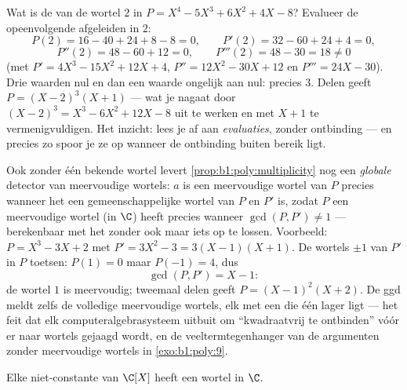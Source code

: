 \begin{example}\label{ex:b1:poly:multexample}
Wat is de  van de wortel $2$ in $P = X^4 - 5X^3 + 6X^2 + 4X
- 8$? Evalueer de opeenvolgende afgeleiden in $2$:
\[
P(2) = 16 - 40 + 24 + 8 - 8 = 0, \qquad
P'(2) = 32 - 60 + 24 + 4 = 0,
\]
\[
P''(2) = 48 - 60 + 12 = 0, \qquad
P'''(2) = 48 - 30 = 18 \neq 0
\]
(met $P' = 4X^3 - 15X^2 + 12X + 4$, $P'' = 12X^2 - 30X + 12$ en $P''' =
24X - 30$). Drie waarden nul en dan een waarde ongelijk aan nul:
 precies $3$. Delen geeft $P = (X - 2)^3(X + 1)$ --- wat je
nagaat door $(X-2)^3 = X^3 - 6X^2 + 12X - 8$ uit te werken en met $X + 1$
te vermenigvuldigen. Het inzicht:  lees je af aan
\emph{evaluaties}, zonder ontbinding --- en precies zo spoor je ze op
wanneer de ontbinding buiten bereik ligt.
\end{example}

\begin{example}\label{ex:b1:poly:gcdmultiple}
Ook zonder één bekende wortel levert
\cref{prop:b1:poly:multiplicity} nog een \emph{globale} detector van
meervoudige wortels: $a$ is een meervoudige wortel van $P$ precies wanneer
het een gemeenschappelijke wortel van $P$ en $P'$ is, zodat $P$ een
meervoudige wortel (in $\C$) heeft precies wanneer $\gcd(P, P') \neq 1$
--- berekenbaar met het  zonder ook maar iets op te
lossen. Voorbeeld: $P = X^3 - 3X + 2$ met $P' = 3X^2 - 3 = 3(X - 1)(X +
1)$. De wortels $\pm1$ van $P'$ in $P$ toetsen: $P(1) = 0$ maar $P(-1) =
4$, dus
\[
\gcd(P, P') = X - 1 :
\]
de wortel $1$ is meervoudig; tweemaal delen geeft $P = (X - 1)^2(X + 2)$.
De ggd meldt zelfs de volledige  meervoudige wortels, elk met
een  die één lager ligt --- het feit dat elk
computeralgebrasysteem uitbuit om ``kwadraatvrij te ontbinden'' vóór er
naar wortels gejaagd wordt, en de veeltermtegenhanger van de argumenten
zonder meervoudige wortels in \cref{exo:b1:poly:9}.
\end{example}

\begin{theorem}\label{thm:b1:poly:fta}
Elke niet-constante  van $\C[X]$ heeft een wortel in
$\C$.
\end{theorem}
\admitted

